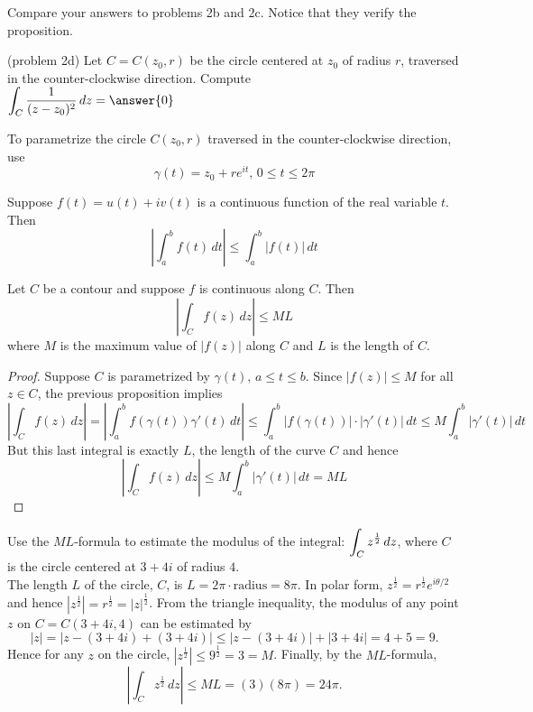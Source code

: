 \documentclass[handout]{ximera}
\begin{document}
Compare your answers to problems 2b and 2c. Notice that they verify the proposition.

\begin{problem}(problem 2d)
Let $C= C(z_0, r)$ be the circle centered at $z_0$ of radius $r$, traversed in the counter-clockwise direction. Compute \\
$\dis \int_C \frac{1}{(z-z_0)^2} \, dz = \answer{0} $\\
\begin{hint}
To parametrize the circle $C(z_0, r)$ traversed in the counter-clockwise direction, use
\[
\gamma(t) = z_0 + re^{it}, \, 0 \leq t \leq 2\pi
\]
\end{hint}
\end{problem}

\begin{proposition}
Suppose $f(t) = u(t) + iv(t)$ is a continuous function of the real variable $t$. Then
\[
\left| \int_a^b f(t) \, dt \right| \leq \int_a^b \left| f(t) \right| \, dt
\]
\end{proposition}

\begin{proposition}[$ML$-formula]
Let $C$ be a contour and suppose $f$ is continuous along $C$. Then
\[
\left| \int_C f(z) \, dz \right| \leq ML
\]
where $M$ is the maximum value of $|f(z)|$ along $C$ and $L$ is the length of $C$. 
\end{proposition}   

\begin{proof}
Suppose $C$ is parametrized by $\gamma(t), \, a \leq t \leq b$. Since $|f(z)| \leq M$ for all $z \in C$, the previous proposition implies
\[
\left| \int_C f(z) \, dz \right| = \left| \int_a^b f(\gamma(t))\gamma'(t) \, dt \right| \leq  \int_a^b \left|f(\gamma(t))\right| \cdot \left|\gamma'(t)\right| \, dt \leq M \int_a^b \left|\gamma'(t)\right| \, dt
\]
But this last integral is exactly $L$, the length of the curve $C$ and hence
\[
\left| \int_C f(z) \, dz \right| \leq M \int_a^b \left|\gamma'(t)\right| \, dt = ML
\]
\end{proof}

\begin{example}[example 3]
Use the $ML$-formula to estimate the modulus of the integral: $\displaystyle \int_C z^\frac12 \, dz$,
where $C$ is the circle centered at $3+4i$ of radius $4$.\\
The length $L$ of the circle, $C$, is $L = 2\pi \cdot \text{radius} = 8\pi$. 
In polar form, $z^\frac12 = r^\frac12 e^{i\theta/2}$ and hence $|z^\frac12| = r^\frac12 = |z|^\frac12$.
From the triangle inequality, the modulus of any point $z$ on $C=C(3+4i, 4)$ can be estimated by
\[
|z| = |z-(3+4i) + (3+4i)| \leq |z-(3+4i)| + |3+4i| = 4+5 = 9.
\]
Hence for any $z$ on the circle, $|z^\frac12| \leq 9^\frac12 = 3 = M$.
Finally, by the $ML$-formula,
\[
\left| \int_C z^\frac12 \, dz \right| \leq ML = (3)(8\pi) = 24\pi.
\]
\end{example}
\end{document}
